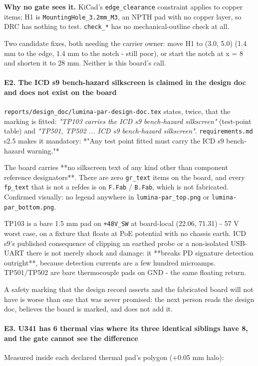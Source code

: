 \documentclass[11pt,a4paper]{article}
\begin{document}
\textbf{Why no gate sees it.} KiCad's \texttt{edge\_clearance} constraint applies to copper items; H1 is \texttt{MountingHole\_3.2mm\_M3}, an NPTH pad with no copper layer, so DRC has nothing to test. \texttt{check\_{*}} has no mechanical-outline check at all.

Two candidate fixes, both needing the carrier owner: move H1 to (3.0, 5.0) (1.4 mm to the edge, 1.4 mm to the notch - still poor), or start the notch at x = 8 and shorten it to 28 mm. Neither is this board's call.

\paragraph*{E2. The ICD s9 bench-hazard silkscreen is claimed in the design doc and does not exist on the board}
\texttt{reports/design\_doc/lumina-par-design-doc.tex} states, twice, that the marking is fitted: \emph{"TP103 carries the ICD s9 bench-hazard silkscreen"} (test-point table) and \emph{"TP501, TP502 ... ICD s9 bench-hazard silkscreen"}. \texttt{requirements.md} s2.5 makes it mandatory: {*}"Any test point fitted must carry the ICD s9 bench-hazard warning."{*}

The board carries {*}{*}no silkscreen text of any kind other than component reference designators{*}{*}. There are zero \texttt{gr\_text} items on the board, and every \texttt{fp\_text} that is not a refdes is on \texttt{F.Fab} / \texttt{B.Fab}, which is not fabricated. Confirmed visually: no legend anywhere in \texttt{lumina-par\_top.png} or \texttt{lumina-par\_bottom.png}.

TP103 is a bare 1.5 mm pad on \texttt{+48V\_SW} at board-local (22.06, 71.31) - 57 V worst case, on a fixture that floats at PoE potential with no chassis earth. ICD s9's published consequence of clipping an earthed probe or a non-isolated USB-UART there is not merely shock and damage: it {*}{*}breaks PD signature detection outright{*}{*}, because detection currents are a few hundred microamps. TP501/TP502 are bare thermocouple pads on GND - the same floating return.

A safety marking that the design record asserts and the fabricated board will not have is worse than one that was never promised: the next person reads the design doc, believes the board is marked, and does not add it.

\paragraph*{E3. U341 has 6 thermal vias where its three identical siblings have 8, and the gate cannot see the difference}
Measured inside each declared thermal pad's polygon (+0.05 mm halo):
\end{document}
